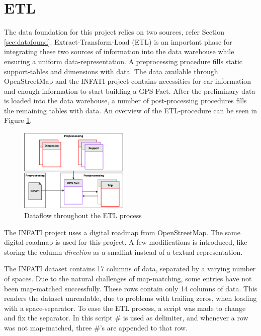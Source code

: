 \section{ETL}\label{sec:ETL}
The data foundation for this project relies on two sources, refer Section \ref{sec:datafound}. Extract-Transform-Load (ETL) is an important phase for integrating these two sources of information into the data warehouse while ensuring a uniform data-representation. A preprocessing procedure fills static support-tables and dimensions with data. The data available through OpenStreetMap and the INFATI project contains necessities for car information and enough information to start building a GPS Fact. After the preliminary data is loaded into the data warehouse, a number of post-processing procedures fills the remaining tables with data. An overview of the ETL-procedure can be seen in Figure \ref{fig:etl}.

\begin{figure}[tb]
\centering
\includegraphics[width=0.465\textwidth]{Pictures/ETL}
\caption{Dataflow throughout the ETL process}
\label{fig:etl}
\end{figure}

The INFATI project\cite{art:INFATI} uses a digital roadmap from OpenStreetMap\cite{osm}. The same digital roadmap is used for this project. A few modifications is introduced, like storing the column \textit{direction} as a smallint instead of a textual representation. 

The INFATI dataset\cite{art:INFATI} contains 17 columns of data, separated by a varying number of spaces. Due to the natural challenges of map-matching, some entries have not been map-matched successfully. These rows contain only 14 columns of data. This renders the dataset unreadable, due to problems with trailing zeros, when loading with a space-separator. To ease the ETL process, a script was made to change and fix the separator. In this script \# is used as delimiter, and whenever a row was not map-matched, three \#'s are appended to that row.

